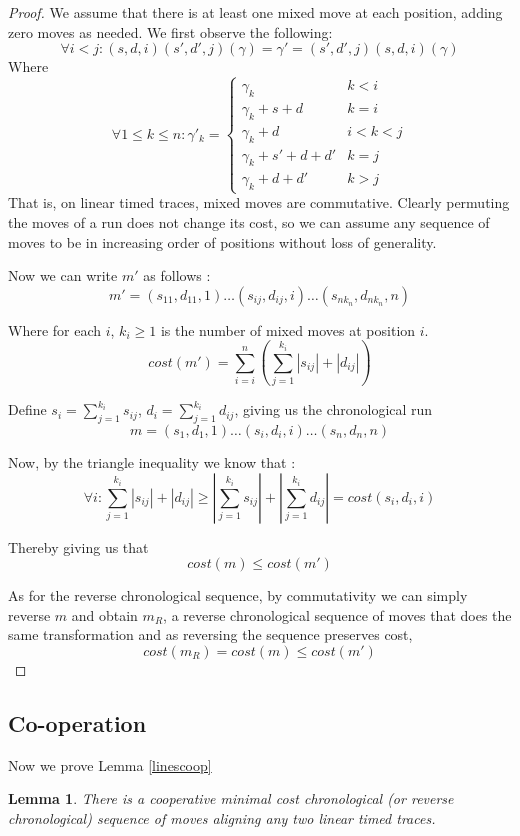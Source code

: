 \documentclass[conference]{IEEEtran}
\newcounter{cases}
\newtheorem*{lemma*}{Lemma}
\begin{document}
\begin{proof}
We assume that there is at least one mixed move at each position, adding zero moves as needed. We first observe the following: 
$$\forall  i < j : (s, d, i)(s', d', j)(\gamma) = \gamma' = (s', d', j)(s, d, i)(\gamma)$$
Where $$\forall 1 \leq k \leq n : \gamma'_k = \begin{cases}
\gamma_k & k <i \\
\gamma_k + s + d & k = i \\
\gamma_k + d & i < k < j \\
\gamma_k + s' + d + d' & k = j \\
\gamma_k + d + d' & k > j
\end{cases}$$
That is, on linear timed traces, mixed moves are commutative. 
Clearly permuting the moves of a run does not change its cost, so we can assume any sequence of moves to be in increasing order of positions without loss of generality.

Now we can write $m'$ as follows : 
$$m' = (s_{11}, d_{11}, 1)\dots (s_{ij}, d_{ij}, i)\dots(s_{nk_n}, d_{nk_n}, n)$$ 

Where for each $i$, $k_i \geq 1$ is the number of mixed moves at position $i$. 
$$cost(m') = \sum_{i = i}^{n} (\sum_{j = 1}^{k_i} |s_{ij}| + |d_{ij}|)$$ 

Define $s_i = \sum_{j = 1}^{k_i} s_{ij}$, $d_i =\sum_{j = 1}^{k_i} d_{ij}$, giving us the chronological run $$m = (s_1, d_1, 1)\dots (s_i, d_i, i)\dots (s_n, d_n, n)$$

Now, by the triangle inequality we know that : 
$$\forall i : \sum_{j = 1}^{k_i} |s_{ij}| + |d_{ij}| \geq | \sum_{j = 1}^{k_i} s_{ij} | + | \sum_{j = 1}^{k_i} d_{ij} | = cost(s_i, d_i, i) $$

Thereby giving us that $$cost(m) \leq cost(m')$$ 

As for the reverse chronological sequence, by commutativity we can simply reverse $m$ and obtain $m_R$, a reverse chronological sequence of moves that does the same transformation and as reversing the sequence preserves cost, $$cost(m_R) = cost(m) \leq cost(m')$$ 
\end{proof}

\subsection{Co-operation} 
Now we prove Lemma \ref{linescoop}
\begin{lemma*}There is a cooperative minimal cost chronological (or reverse chronological) sequence of moves aligning any two linear timed traces. 
\end{lemma*}
\end{document}
